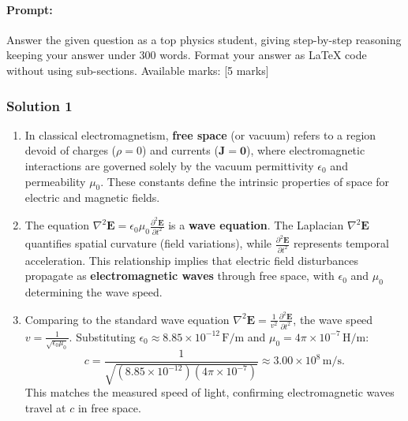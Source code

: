 \documentclass{article}
\begin{document}
\paragraph{Prompt: \\} 
Answer the given question as a top physics student, giving step-by-step reasoning keeping your answer under 300 words. Format your answer as LaTeX code without using sub-sections. Available marks: [5 marks]

\subsubsection{Solution 1}
\begin{enumerate}
    \item In classical electromagnetism, \textbf{free space} (or vacuum) refers to a region devoid of charges (\(\rho = 0\)) and currents (\(\mathbf{J} = \mathbf{0}\)), where electromagnetic interactions are governed solely by the vacuum permittivity \(\epsilon_0\) and permeability \(\mu_0\). These constants define the intrinsic properties of space for electric and magnetic fields.
    
    \item The equation \(\nabla^2 \mathbf{E} = \epsilon_0 \mu_0 \frac{\partial^2 \mathbf{E}}{\partial t^2}\) is a \textbf{wave equation}. The Laplacian \(\nabla^2 \mathbf{E}\) quantifies spatial curvature (field variations), while \(\frac{\partial^2 \mathbf{E}}{\partial t^2}\) represents temporal acceleration. This relationship implies that electric field disturbances propagate as \textbf{electromagnetic waves} through free space, with \(\epsilon_0\) and \(\mu_0\) determining the wave speed.
    
    \item Comparing to the standard wave equation \(\nabla^2 \mathbf{E} = \frac{1}{v^2} \frac{\partial^2 \mathbf{E}}{\partial t^2}\), the wave speed \(v = \frac{1}{\sqrt{\epsilon_0 \mu_0}}\). Substituting \(\epsilon_0 \approx 8.85 \times 10^{-12} \, \mathrm{F/m}\) and \(\mu_0 = 4\pi \times 10^{-7} \, \mathrm{H/m}\):  
    \[
    c = \frac{1}{\sqrt{(8.85 \times 10^{-12})(4\pi \times 10^{-7})}} \approx 3.00 \times 10^8 \, \mathrm{m/s}.
    \]
    This matches the measured speed of light, confirming electromagnetic waves travel at \(c\) in free space.
\end{enumerate}
\end{document}
